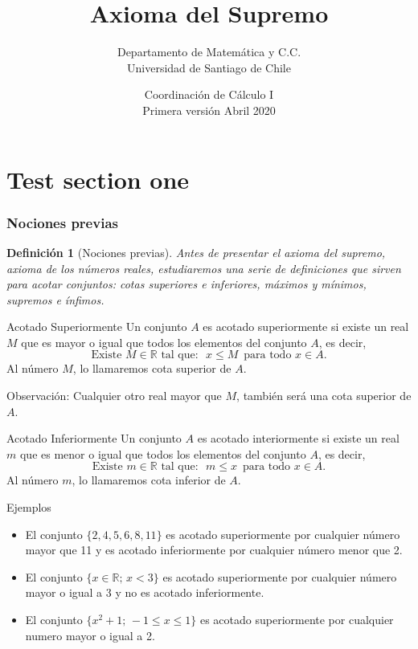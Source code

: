 \documentclass[5pt]{beamer} %
\title{Axioma del Supremo }
\author[USACH]{{ \vspace{.5cm}Departamento de Matem\'atica y C.C.\\ \vspace{.1cm}Universidad de Santiago de Chile}}
\institute[ Cálculo I]{ \small 
}
\date{\tiny Coordinación de Cálculo I\\ \vspace{.1 cm} Primera versión Abril 2020}
\newtheorem{Definicion}{Definici\'on}
\begin{document}
 
\maketitle
\section{Test section one}
\begin{frame}
\frametitle{Nociones previas}

\begin{Definicion}[Nociones previas]
Antes de presentar el axioma del supremo, axioma de los números reales, estudiaremos una serie de definiciones que sirven para acotar conjuntos: cotas superiores e inferiores, máximos y mínimos,
supremos e ínfimos. \\\vspace{.3cm}
\end{Definicion}

\begin{block}{Acotado Superiormente} Un conjunto $A$ es acotado superiormente si existe un real $M$ que es mayor o igual que todos los elementos del conjunto $A$, es decir,
	$$\mbox{Existe}\,\,M\in\mathbb{R}\,\,\mbox{tal que}:\,\,\, x\leq M\,\,\,\mbox{para todo}\,\,x\in A.$$
Al número $M$, lo llamaremos cota superior de $A$.	
	\vspace{.2cm}

\end{block}

Observación: Cualquier otro real mayor que $M$, también será una cota superior de $A$.
\end{frame}


\begin{frame}
	\begin{block}{Acotado Inferiormente} Un conjunto $A$ es acotado interiormente si existe un real $m$ que es menor o igual que todos los elementos del conjunto $A$, es decir,
		$$\mbox{Existe}\,\,m\in\mathbb{R}\,\,\mbox{tal que}:\,\,\, m\leq x\,\,\,\mbox{para todo}\,\,x\in A.$$
		Al número $m$, lo llamaremos cota inferior de $A$.	
		\vspace{.2cm}		
	\end{block}

\begin{exampleblock}{Ejemplos}
\begin{itemize}
	\item El conjunto $\{2,4,5,6,8,11\}$ es acotado superiormente por cualquier número mayor que 11 y es acotado inferiormente por cualquier número menor que 2.
	
	\item El conjunto $\{x\in\mathbb{R};\, x<3\}$ es acotado superiormente por cualquier número mayor o igual a 3 y no es acotado inferiormente.
	
	\item El conjunto $\{x^2+1;\, -1\leq x\leq 1\}$ es acotado superiormente por cualquier numero mayor o igual a 2.
\end{itemize}
\end{exampleblock}

\end{frame}
\end{document}
